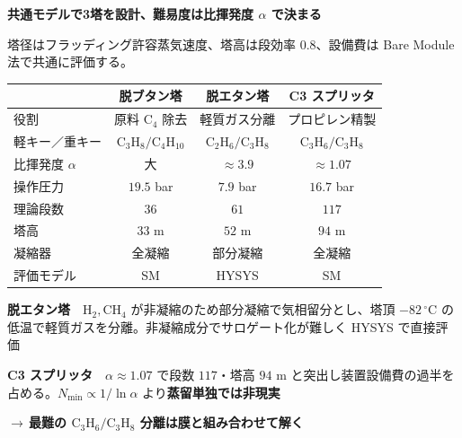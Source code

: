 \begin{frame}

  {\bfseries\large 共通モデルで3塔を設計、難易度は比揮発度 $\alpha$ で決まる}\par
  \vspace{0.15em}
  {\footnotesize 塔径はフラッディング許容蒸気速度、塔高は段効率 $0.8$、設備費は Bare Module 法で共通に評価する。}\par

  \vspace{0.7em}

  \centering
  {\footnotesize\renewcommand{\arraystretch}{1.22}%
   \begin{tabular}{@{}l c c c@{}}
     \toprule
      & 脱ブタン塔 & 脱エタン塔 & C3 スプリッタ \\
     \midrule
     役割          & 原料 $\mathrm{C_4}$ 除去 & 軽質ガス分離 & プロピレン精製 \\
     軽キー／重キー & $\mathrm{C_3H_8}/\mathrm{C_4H_{10}}$ & $\mathrm{C_2H_6}/\mathrm{C_3H_8}$ & $\mathrm{C_3H_6}/\mathrm{C_3H_8}$ \\
     比揮発度 $\alpha$ & 大 & $\approx 3.9$ & {\boldmath\color{SpRed}$\approx 1.07$} \\
     操作圧力      & $19.5$ bar & $7.9$ bar & $16.7$ bar \\
     理論段数      & $36$ & $61$ & {\boldmath\color{SpRed}$117$} \\
     塔高          & $33$ m & $52$ m & {\boldmath\color{SpRed}$94$ m} \\
     凝縮器        & 全凝縮 & 部分凝縮 & 全凝縮 \\
     評価モデル    & SM & HYSYS & SM \\
     \bottomrule
   \end{tabular}}\par

  \vspace{0.45em}

  \raggedright
  {\footnotesize
   \textbf{脱エタン塔}　$\mathrm{H_2},\mathrm{CH_4}$ が非凝縮のため部分凝縮で気相留分とし、塔頂 $-82\,^\circ$C の低温で軽質ガスを分離。非凝縮成分でサロゲート化が難しく HYSYS で直接評価\par
   \vspace{0.3em}
   \textbf{C3 スプリッタ}　$\alpha\!\approx\!1.07$ で段数 $117$・塔高 $94$ m と突出し装置設備費の過半を占める。$N_{\min}\!\propto\!1/\ln\alpha$ より\textbf{蒸留単独では非現実}\par
   \vspace{0.2em}
   \hspace{1.2em}$\to$\,\textbf{最難の $\mathrm{C_3H_6}/\mathrm{C_3H_8}$ 分離は膜と組み合わせて解く}}

\end{frame}
